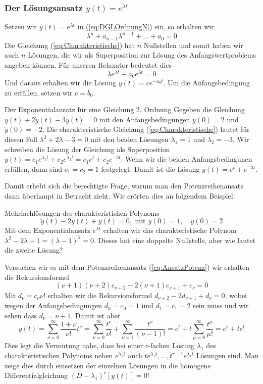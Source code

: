 \subsubsection{Der Lösungsansatz $y(t)=e^{\lambda t}$}
Setzen wir $y(t)=e^{\lambda t}$ in (\ref{eq:DGLOrdnungN}) ein, so erhalten wir
\begin{equation}
  \lambda^n+a_{n-1}\lambda^{n-1}+\dots +a_0=0
  \label{eq:Charakteristische}
\end{equation}
Die Gleichung (\ref{eq:Charakteristische}) hat $n$ Nullstellen und somit haben
wir auch $n$ Lösungen, die wir als Superposition zur Lösung des
Anfangswertproblems angeben können. Für unseren Relaxator bedeutet dies
\[ \lambda e^{\lambda t}+a_0e^{\lambda t}=0\]
Und daraus erhalten wir die Lösung $y(t)=ce^{-a_0 t}$. Um die Anfangsbedingung
zu erfüllen, setzen wir $c=b_0$.

\begin{example}{Der Exponentialansatz für eine Gleichung 2. Ordnung}
  Gegeben die Gleichung $\ddot{y}(t)+2\dot{y}(t)-3y(t)=0$ mit den
  Anfangsbedingungen $y(0)=2$ und $\dot{y}(0)=-2$. Die charakteristische
  Gleichung (\ref{eq:Charakteristische}) lautet für diesen Fall
  $\lambda^2+2\lambda-3=0$ mit den beiden Lösungen $\lambda_1=1$ und
  $\lambda_2=-3$. Wir schreiben die Lösung der Gleichung als Superposition
  $y(t)=c_1e^{\lambda_1 t}+c_2e^{\lambda_2 t}=c_1e^{t}+c_2e^{-3 t}$. Wenn wir
  die beiden Anfangsbedingunen erfüllen, dann sind $c_1=c_2=1$ festgelegt.
  Damit ist die Lösung $y(t)=e^t+e^{-3t}$.
\end{example}
Damit erhebt sich die berechtigte Frage, warum man den Potenzreihenansatz dann
überhaupt in Betracht zieht. Wir erörten dies an folgendem Beispiel:
\begin{example}{Mehrfachlösungen des charakteristishen Polynoms}
  \[\ddot{y}(t)-2\dot{y}(t)+y(t)=0,\mbox{ mit } y(0)=1,\quad \dot{y}(0)=2\]
Mit dem Exponentialansatz $e^{\lambda t}$ erhalten wir das charakteristische
Polynom $\lambda^2-2\lambda+1=(\lambda -1)^2=0$. Dieses hat eine
doppelte Nullstelle, aber wie lautet die zweite Lösung?
\end{example}
Versuchen wir es mit dem Potenzreihenansatz (\ref{eq:AnsatzPotenz}) wir
erhalten die Rekursionsformel
\[ (\nu+1)(\nu+2)c_{\nu+2}-2(\nu+1)c_{\nu+1}+c_\nu=0\]
Mit $d_\nu=c_{\nu}\nu!$ erhalten wir die Rekursionsformel
$d_{\nu+2}-2d_{\nu+1}+d_\nu=0$, wobei wegen der Anfangsbedingungen $d_0=c_0=1$
und $d_1=c_1=2$ sein muss und wir sehen dass $d_\nu=\nu+1$. Damit ist aber
\[ 
  y(t)=\sum\limits_{\nu=0}^{\infty}\frac{1+\nu}{\nu!}t^\nu=
        \sum\limits_{\nu=0}^{\infty}\frac{t^\nu}{\nu!}
       +\sum\limits_{\nu=1}^{\infty}\frac{t^\nu}{(\nu-1)!}=
        e^t+t\sum\limits_{\mu=0}^{\infty}\frac{t^\mu}{\mu!}=e^t+te^t
\]       
Dies legt die Vermutung nahe, dass bei einer r-fachen Lösung $\lambda_1$ des
charakteristischen Polynoms neben $e^{\lambda_1 t}$ auch $te^{\lambda_1
t},\dots,t^{r-1}e^{\lambda_1 t}$ Lösungen sind. Man zeige dies durch einsetzen
der einzelnen Lösungen in die homogene Differentialgleichung
$(D-\lambda_1)^r[y(t)]=0$!
%
